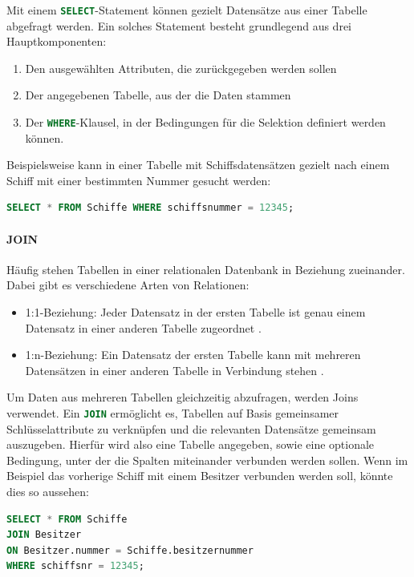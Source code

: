 Mit einem \lstinline[language=SQL]|SELECT|-Statement können gezielt Datensätze aus einer Tabelle abgefragt werden. Ein solches Statement besteht grundlegend aus drei Hauptkomponenten:  
\begin{enumerate}[noitemsep]
    \item Den ausgewählten Attributen, die zurückgegeben werden sollen
    \item Der angegebenen Tabelle, aus der die Daten stammen 
    \item Der \lstinline[language=SQL]|WHERE|-Klausel, in der Bedingungen für die Selektion definiert werden können. 
\end{enumerate}

Beispielsweise kann in einer Tabelle mit Schiffsdatensätzen gezielt nach einem Schiff mit einer bestimmten Nummer gesucht werden:
\begin{lstlisting}[language=SQL]
SELECT * FROM Schiffe WHERE schiffsnummer = 12345;
\end{lstlisting}

\paragraph{JOIN}
Häufig stehen Tabellen in einer relationalen Datenbank in Beziehung zueinander. Dabei gibt es verschiedene Arten von Relationen:
\begin{itemize}[noitemsep]
    \item 1:1-Beziehung: Jeder Datensatz in der ersten Tabelle ist genau einem Datensatz in einer anderen Tabelle zugeordnet \cite{Elmasri2015}.
    \item 1:n-Beziehung: Ein Datensatz der ersten Tabelle kann mit mehreren Datensätzen in einer anderen Tabelle in Verbindung stehen \cite{Elmasri2015}.
\end{itemize}

Um Daten aus mehreren Tabellen gleichzeitig abzufragen, werden Joins verwendet. Ein \lstinline[language=SQL]|JOIN| ermöglicht es, Tabellen auf Basis gemeinsamer Schlüsselattribute zu verknüpfen und die relevanten Datensätze gemeinsam auszugeben.
Hierfür wird also eine Tabelle angegeben, sowie eine optionale Bedingung, unter der die Spalten miteinander verbunden werden sollen.
Wenn im Beispiel das vorherige Schiff mit einem Besitzer verbunden werden soll, könnte dies so aussehen:
\begin{lstlisting}[language=SQL]
SELECT * FROM Schiffe 
JOIN Besitzer 
ON Besitzer.nummer = Schiffe.besitzernummer
WHERE schiffsnr = 12345;
\end{lstlisting}

